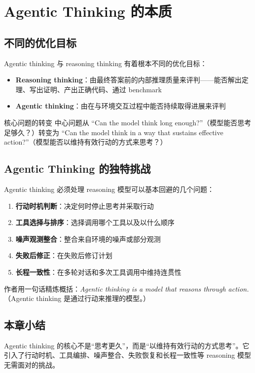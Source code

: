 \section{Agentic Thinking 的本质}

\subsection{不同的优化目标}

Agentic thinking 与 reasoning thinking 有着根本不同的优化目标：

\begin{itemize}
    \item \textbf{Reasoning thinking}：由最终答案前的内部推理质量来评判——能否解出定理、写出证明、产出正确代码、通过 benchmark
    \item \textbf{Agentic thinking}：由在与环境交互过程中能否持续取得进展来评判
\end{itemize}

\begin{importantbox}{核心问题的转变}
中心问题从 ``Can the model think long enough?''（模型能否思考足够久？）转变为 ``Can the model think in a way that sustains effective action?''（模型能否以维持有效行动的方式来思考？）
\end{importantbox}

\subsection{Agentic Thinking 的独特挑战}

Agentic thinking 必须处理 reasoning 模型可以基本回避的几个问题：

\begin{enumerate}
    \item \textbf{行动时机判断}：决定何时停止思考并采取行动
    \item \textbf{工具选择与排序}：选择调用哪个工具以及以什么顺序
    \item \textbf{噪声观测整合}：整合来自环境的噪声或部分观测
    \item \textbf{失败后修正}：在失败后修订计划
    \item \textbf{长程一致性}：在多轮对话和多次工具调用中维持连贯性
\end{enumerate}

作者用一句话精炼概括：\textit{Agentic thinking is a model that reasons through action.}（Agentic thinking 是通过行动来推理的模型。）

\subsection{本章小结}

Agentic thinking 的核心不是``思考更久''，而是``以维持有效行动的方式思考''。它引入了行动时机、工具编排、噪声整合、失败恢复和长程一致性等 reasoning 模型无需面对的挑战。


